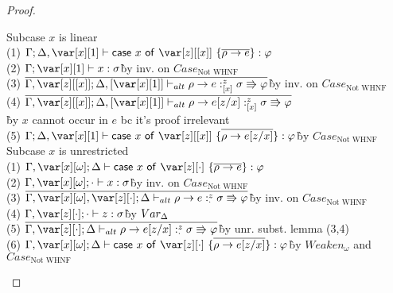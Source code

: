 \BinderSwapTheorem

%
%
%
%

\begin{proof}~
\begin{tabbing}
    Subcase $x$ is linear\\
    (1) $\G; \D,\xl \vdash \ccase{x}{\z[\irr{x}]~\{\ov{\rho \to e}\}} : \vp$\\
    (2) $\G; \xl \vdash x : \s$\`by inv. on $Case_\textrm{Not WHNF}$\\
    (3) $\ov{\G, \z[\irr{x}]; \D, \irr{\xl} \vdash_{alt} \rho \to e :^z_{\irr{x}} \s \Rrightarrow \vp}$\`by inv. on $Case_\textrm{Not WHNF}$\\
    (4) $\ov{\G, \z[\irr{x}]; \D, \irr{\xl} \vdash_{alt} \rho \to e[z/x] :^z_{\irr{x}} \s \Rrightarrow \vp}$\\\`by $x$ cannot occur in $e$ bc it's proof irrelevant\\
    (5) $\G;\D,\xl \vdash \ccase{x}{\z[\irr{x}]~\{\ov{\rho \to e[z/x]}\}} : \vp$\`by $Case_\textrm{Not WHNF}$\\
    Subcase $x$ is unrestricted\\
    (1) $\G,\xo; \D \vdash \ccase{x}{\z[\cdot]~\{\ov{\rho \to e}\}} : \vp$\\
    (2) $\G,\xo; \cdot \vdash x : \s$\`by inv. on $Case_\textrm{Not WHNF}$\\
    (3) $\ov{\G,\xo, \z[\cdot]; \D \vdash_{alt} \rho \to e :^z_{\cdot} \s \Rrightarrow \vp}$\`by inv. on $Case_\textrm{Not WHNF}$\\
    (4) $\G,\z[\cdot]; \cdot \vdash z : \s$\`by $Var_\Delta$\\
    (5) $\ov{\G, \z[\cdot]; \D \vdash_{alt} \rho \to e[z/x] :^z_{\cdot} \s \Rrightarrow \vp}$\`by unr. subst. lemma (3,4)\\
    (6) $\G,\xo;\D \vdash \ccase{x}{\z[\cdot]~\{\ov{\rho \to e[z/x]}\}} : \vp$\`by $Weaken_\omega$ and $Case_\textrm{Not WHNF}$\\
\end{tabbing}



\end{proof}
